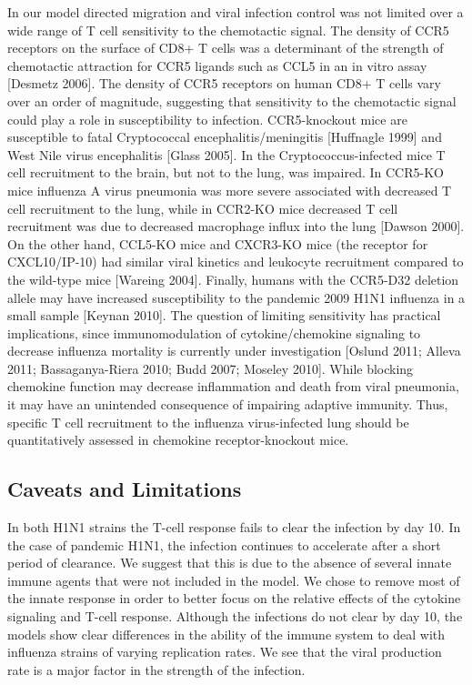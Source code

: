\documentclass[10pt]{article}
\begin{document}
In our model directed migration and viral infection control was not limited over a wide range of T cell sensitivity to the chemotactic signal.  The density of CCR5 receptors on the surface of CD8+ T cells was a determinant of the strength of chemotactic attraction for CCR5 ligands such as CCL5 in an in vitro assay [Desmetz 2006].   The density of CCR5 receptors on human CD8+ T cells vary over an order of magnitude, suggesting that sensitivity to the chemotactic signal could play a role in susceptibility to infection.  CCR5-knockout mice are susceptible to fatal Cryptococcal encephalitis/meningitis [Huffnagle 1999] and West Nile virus encephalitis [Glass 2005].  In the Cryptococcus-infected mice T cell recruitment to the brain, but not to the lung, was impaired.   In CCR5-KO mice influenza A virus pneumonia was more severe associated with decreased T cell recruitment to the lung, while in CCR2-KO mice decreased T cell recruitment was due to decreased macrophage influx into the lung [Dawson 2000].  On the other hand, CCL5-KO mice and CXCR3-KO mice (the receptor for CXCL10/IP-10) had similar viral kinetics and leukocyte recruitment compared to the wild-type mice [Wareing 2004].  Finally, humans with the CCR5-D32 deletion allele may have increased susceptibility to the pandemic 2009 H1N1 influenza in a small sample [Keynan 2010].  The question of limiting sensitivity has practical implications, since immunomodulation of cytokine/chemokine signaling to decrease influenza mortality is currently under investigation [Oslund 2011; Alleva 2011; Bassaganya-Riera 2010; Budd 2007; Moseley 2010].  While blocking chemokine function may decrease inflammation and death from viral pneumonia, it may have an unintended consequence of impairing adaptive immunity.  Thus, specific T cell recruitment to the influenza virus-infected lung should be quantitatively assessed in chemokine receptor-knockout mice.

\subsection*{Caveats and Limitations}

In both H1N1 strains the T-cell response fails to clear the infection by day 10.  In the case of pandemic H1N1, the infection continues to accelerate after a short period of clearance.  We suggest that this is due to the absence of several innate immune agents that were not included in the model.  We chose to remove most of the innate response in order to better focus on the relative effects of the cytokine signaling and T-cell response.  Although the infections do not clear by day 10, the models show clear differences in the ability of the immune system to deal with influenza strains of varying replication rates.  We see that the viral production rate is a major factor in the strength of the infection.
\end{document}
